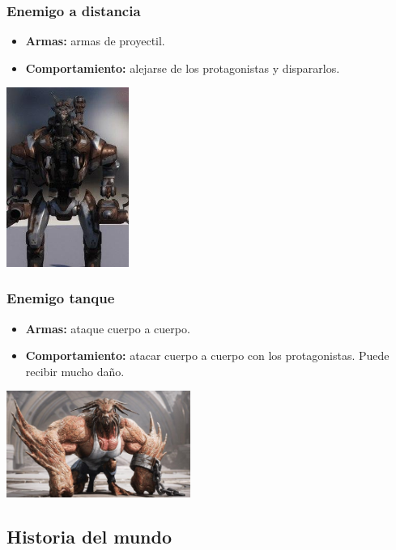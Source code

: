 \documentclass[11pt, twoside]{article}
\begin{document}
\subsubsection{Enemigo a distancia}
\begin{itemize}
\item \textbf{Armas:} armas de proyectil.
\item \textbf{Comportamiento:} alejarse de los protagonistas y dispararlos.
\end{itemize}

\begin{center}
\includegraphics[width=4cm]{./images/distancia.jpg}
\end{center}

\subsubsection{Enemigo tanque}
\begin{itemize}
\item \textbf{Armas:} ataque cuerpo a cuerpo. 
\item \textbf{Comportamiento:} atacar cuerpo a cuerpo con los protagonistas. Puede recibir mucho daño. 
\end{itemize}

\begin{center}
\includegraphics[width=6cm]{./images/tanque.jpg}
\end{center}


\subsection{Historia del mundo}
\end{document}
